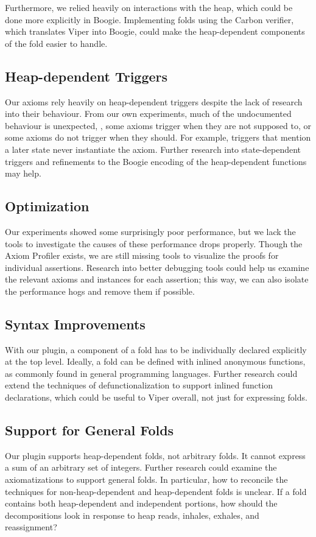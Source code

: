 \documentclass[msc,oneside]{ubcthesis}
\theoremstyle{definition}
\begin{document}
Furthermore, we relied heavily on interactions with the heap, which could be done more explicitly in Boogie. Implementing folds using the Carbon verifier, which translates Viper into Boogie, could make the heap-dependent components of the fold easier to handle. 

\subsection{Heap-dependent Triggers}
Our axioms rely heavily on heap-dependent triggers despite the lack of research into their behaviour. From our own experiments, much of the undocumented behaviour is unexpected, \ie, some axioms trigger when they are not supposed to, or some axioms do not trigger when they should. For example, triggers that mention a later state never instantiate the axiom. Further research into state-dependent triggers and refinements to the Boogie encoding of the heap-dependent functions may help. 


\subsection{Optimization}
Our experiments showed some surprisingly poor performance, but we lack the tools to investigate the causes of these performance drops properly. Though the Axiom Profiler exists, we are still missing tools to visualize the proofs for individual assertions. Research into better debugging tools could help us examine the relevant axioms and instances for each assertion; this way, we can also isolate the performance hogs and remove them if possible.

\subsection{Syntax Improvements}
With our plugin, a component of a fold has to be individually declared explicitly at the top level. Ideally, a fold can be defined with inlined anonymous functions, as commonly found in general programming languages. Further research could extend the techniques of defunctionalization to support inlined function declarations, which could be useful to Viper overall, not just for expressing folds.  

\subsection{Support for General Folds}
Our plugin supports heap-dependent folds, not arbitrary folds. It cannot express a sum of an arbitrary set of integers. Further research could examine the axiomatizations to support general folds. In particular, how to reconcile the techniques for non-heap-dependent and heap-dependent folds is unclear. If a fold contains both heap-dependent and independent portions, how should the decompositions look in response to heap reads, inhales, exhales, and reassignment? 
\end{document}
